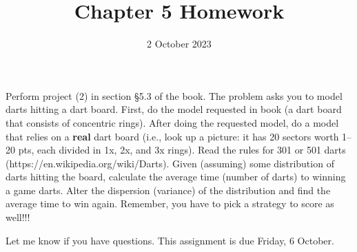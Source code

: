 \documentclass{article}
\title{Chapter 5 Homework}
\date{2 October 2023}
\begin{document}
\maketitle


Perform project (2) in section \S5.3 of the book. The problem asks you to model darts hitting a dart board. First, do the model requested in book (a dart board that consists of concentric rings). After doing the requested model, do a model that relies on a \textbf{real} dart board (i.e., look up a picture: it has 20 sectors worth 1--20 pts, each divided in 1x, 2x, and 3x rings). Read the rules for 301 or 501 darts (https://en.wikipedia.org/wiki/Darts). Given (assuming) some distribution of darts hitting the board, calculate the average time (number of darts) to winning a game darts. Alter the dispersion (variance) of the distribution and find the average time to win again. Remember, you have to pick a strategy to score as well!!!

Let me know if you have questions. This assignment is due Friday, 6 October. 
\end{document}
